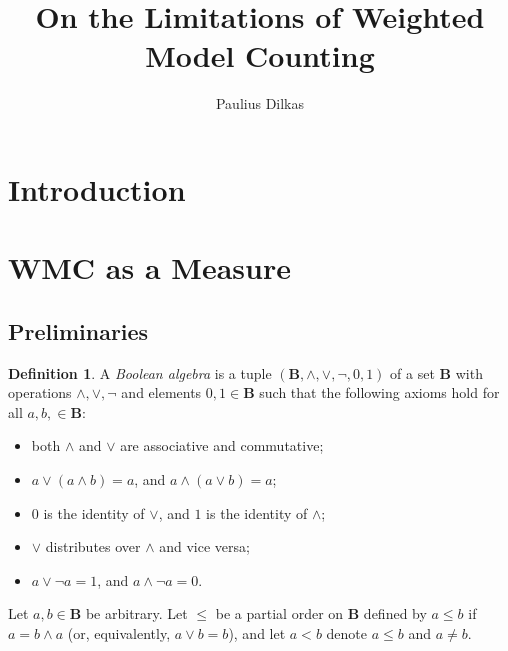 \documentclass{article}
\title{On the Limitations of Weighted Model Counting}
\author{Paulius Dilkas}
\theoremstyle{definition}
\newtheorem{definition}{Definition}
\theoremstyle{remark}
\begin{document}
\maketitle

\section{Introduction}




\section{WMC as a Measure}

\subsection{Preliminaries}

\begin{definition} \label{def:ba}
  A \emph{Boolean algebra} is a tuple $(\mathbf{B}, \land, \lor, \neg, 0, 1)$ of
  a set $\mathbf{B}$ with operations $\land, \lor, \neg$ and elements $0, 1 \in
  \mathbf{B}$ such that the following axioms hold for all $a, b, \in
  \mathbf{B}$:
  \begin{itemize}
  \item both $\land$ and $\lor$ are associative and commutative;
  \item $a \lor (a \land b) = a$, and $a \land (a \lor b) = a$;
  \item $0$ is the identity of $\lor$, and $1$ is the identity of $\land$;
  \item $\lor$ distributes over $\land$ and vice versa;
  \item $a \lor \neg a = 1$, and $a \land \neg a = 0$.
  \end{itemize}

  Let $a, b \in \mathbf{B}$ be arbitrary. Let $\le$ be a partial order on
  $\mathbf{B}$ defined by $a \le b$ if $a = b \land a$ (or, equivalently, $a
  \lor b = b$), and let $a < b$ denote $a \le b$ and $a \ne b$.
\end{definition}
\end{document}
